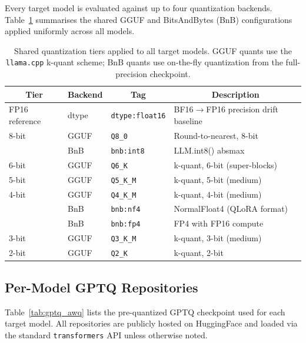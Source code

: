 Every target model is evaluated against up to four quantization backends.
Table~\ref{tab:quant_tiers} summarises the shared GGUF and BitsAndBytes (BnB) configurations applied uniformly across all models.

\begin{table}[h]
\centering
\caption{Shared quantization tiers applied to all target models. GGUF quants use the \texttt{llama.cpp} k-quant scheme; BnB quants use on-the-fly quantization from the full-precision checkpoint.}
\label{tab:quant_tiers}
\small
\begin{tabular}{@{}llll@{}}
\toprule
\multicolumn{1}{c}{\textbf{Tier}} & \multicolumn{1}{c}{\textbf{Backend}} & \multicolumn{1}{c}{\textbf{Tag}} & \multicolumn{1}{c}{\textbf{Description}} \\
\midrule
FP16 reference & dtype   & \texttt{dtype:float16} & BF16$\to$FP16 precision drift baseline \\
\midrule
8-bit          & GGUF    & \texttt{Q8\_0}         & Round-to-nearest, 8-bit \\
               & BnB     & \texttt{bnb:int8}      & LLM.int8() absmax \\
6-bit          & GGUF    & \texttt{Q6\_K}         & k-quant, 6-bit (super-blocks) \\
5-bit          & GGUF    & \texttt{Q5\_K\_M}      & k-quant, 5-bit (medium) \\
4-bit          & GGUF    & \texttt{Q4\_K\_M}      & k-quant, 4-bit (medium) \\
               & BnB     & \texttt{bnb:nf4}       & NormalFloat4 (QLoRA format) \\
               & BnB     & \texttt{bnb:fp4}       & FP4 with FP16 compute \\
3-bit          & GGUF    & \texttt{Q3\_K\_M}      & k-quant, 3-bit (medium) \\
2-bit          & GGUF    & \texttt{Q2\_K}         & k-quant, 2-bit \\
\bottomrule
\end{tabular}
\end{table}


\subsection{Per-Model GPTQ Repositories}
\label{app:gptq_awq}

Table~\ref{tab:gptq_awq} lists the pre-quantized GPTQ checkpoint used for each target model.
All repositories are publicly hosted on HuggingFace and loaded via the standard \texttt{transformers} API unless otherwise noted.

